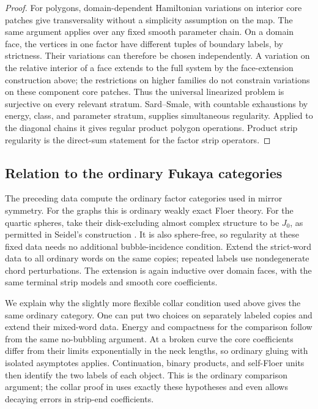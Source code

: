 \documentclass[11pt]{article}
\numberwithin{equation}{section}
\theoremstyle{definition}
\theoremstyle{remark}
\begin{document}
\begin{proof}
For polygons, domain-dependent Hamiltonian variations on interior
core patches give transversality without a simplicity assumption on
the map.  The same argument applies over any fixed smooth parameter
chain.  On a domain face, the vertices in one factor have different
tuples of boundary labels, by strictness.  Their variations can
therefore be chosen independently.  A variation on the relative
interior of a face extends to the full system by the face-extension
construction above; the restrictions on higher families do not
constrain variations on these component core patches.  Thus the
universal linearized problem is surjective on every relevant
stratum.  Sard--Smale, with countable exhaustions by energy, class,
and parameter stratum, supplies simultaneous regularity.  Applied to
the diagonal chains it gives regular product polygon operations.
Product strip regularity is the direct-sum statement for the factor
strip operators.
\end{proof}

\subsection{Relation to the ordinary Fukaya categories}
\label{comp:ordinary}

The preceding data compute the ordinary factor categories used in
mirror symmetry.  For the graphs this is ordinary weakly exact
Floer theory.  For the quartic spheres, take their disk-excluding
almost complex structure to be $J_0$, as permitted in Seidel's
construction \cite[Section~8]{SeidelQuartic}.  It is also sphere-free,
so regularity at these fixed data needs no additional bubble-incidence
condition.  Extend the strict-word data to all ordinary words on the
same copies; repeated labels use nondegenerate chord perturbations.
The extension is again inductive over domain faces, with the same
terminal strip models and smooth core coefficients.

We explain why the slightly more flexible collar condition used
above gives the same ordinary category.  One can put two choices on
separately labeled copies and extend their mixed-word data.  Energy
and compactness for the comparison follow from the same no-bubbling
argument.  At a broken curve the core coefficients differ from their
limits exponentially in the neck lengths, so ordinary gluing with
isolated asymptotes applies.  Continuation, binary products, and
self-Floer units then identify the two labels of each object.  This
is the ordinary comparison argument; the collar proof in
\cite[Proposition~7.5]{A8} uses exactly these hypotheses and even
allows decaying errors in strip-end coefficients.
\end{document}
